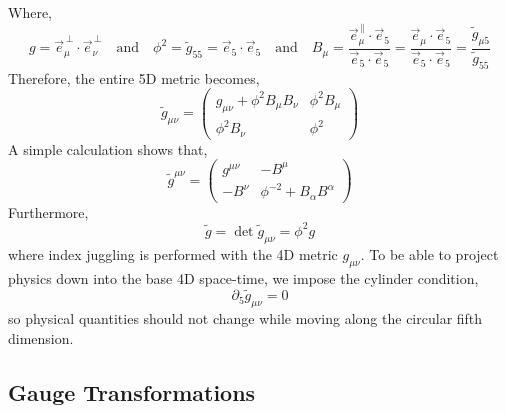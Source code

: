 \documentclass[11pt, a4paper]{article}
\begin{document}
Where,
\[g = \vec{e}^{\, \perp}_{\mu} \cdot \vec{e}^{\, \perp}_{\nu} \quad \text{and} \quad \phi^2 = \tilde{g}_{55} = \vec{e}_5 \cdot \vec{e}_5 \quad \text{and} \quad B_\mu = \frac{\vec{e}^{\, \parallel}_\mu \cdot \vec{e}_5}{\vec{e}_5 \cdot \vec{e}_5} = \frac{\vec{e}_\mu \cdot \vec{e}_5}{\vec{e}_5 \cdot \vec{e}_5} =  \frac{\tilde{g}_{\mu5}}{\tilde{g}_{55}} \]
Therefore, the entire 5D metric becomes,
\[ \tilde{g}_{\mu \nu} = \begin{pmatrix}
g_{\mu \nu} + \phi^2 B_\mu B_\nu & \phi^2 B_\mu \\
\phi^2 B_\nu & \phi^2
\end{pmatrix}\]
A simple calculation shows that,
\[ \tilde{g}^{\mu \nu} = 
\begin{pmatrix}
g^{\mu \nu} & - B^\mu \\
- B^\nu & \phi^{-2} + B_\alpha B^\alpha
\end{pmatrix}\]
Furthermore,
\[ \tilde{g} = \det{\tilde{g}_{\mu \nu}} = \phi^2 g \] 
where index juggling is performed with the 4D metric $g_{\mu \nu}$. To be able to project physics down into the base 4D space-time, we impose the cylinder condition,
\[ \partial_5 \tilde{g}_{\mu \nu} = 0 \]
so physical quantities should not change while moving along the circular fifth dimension. 

\subsection{Gauge Transformations}
\end{document}
